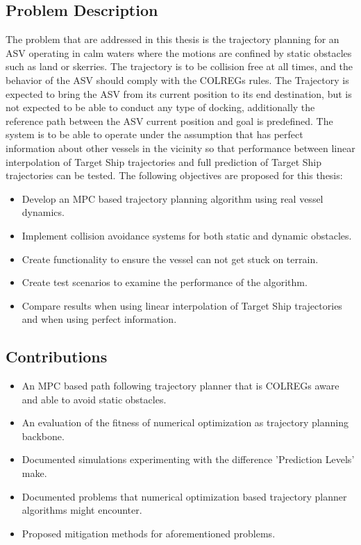 \subsection{Problem Description}
The problem that are addressed in this thesis is the trajectory planning for an \gls{ASV} operating in calm waters
where the motions are confined by static obstacles such as land or skerries. The trajectory is to be collision
free at all times, and the behavior of the \gls{ASV} should comply with the COLREGs rules. The Trajectory is expected
to bring the \gls{ASV} from its current position to its end destination, but is not expected to be able to conduct
any type of docking, additionally the reference path between the \gls{ASV} current position and goal is predefined.
The system is to be able to operate under the assumption that has perfect information
about other vessels in the vicinity so that performance between linear interpolation of Target Ship trajectories
and full prediction of Target Ship trajectories can be tested.
The following objectives are proposed for this thesis:
\begin{itemize}
    \item Develop an MPC based trajectory planning algorithm using real vessel dynamics.
    \item Implement collision avoidance systems for both static and dynamic obstacles.
    \item Create functionality to ensure the vessel can not get stuck on terrain.
    \item Create test scenarios to examine the performance of the algorithm.
    \item Compare results when using linear interpolation of Target Ship trajectories and when using perfect information.
\end{itemize}


\subsection{Contributions}
\begin{itemize}
    \item An MPC based path following trajectory planner that is COLREGs aware and able to avoid static obstacles.
    \item An evaluation of the fitness of numerical optimization as trajectory planning backbone.
    \item Documented simulations experimenting with the difference 'Prediction Levels' make.
    \item Documented problems that numerical optimization based trajectory planner algorithms might encounter.
    \item Proposed mitigation methods for aforementioned problems.
\end{itemize}

